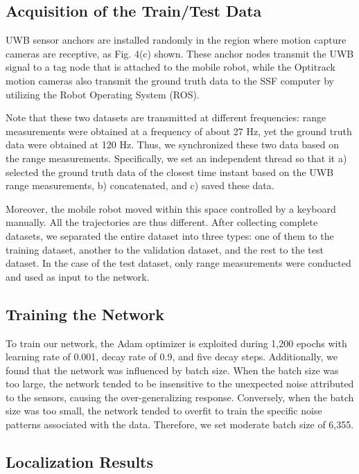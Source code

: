 \documentclass[letterpaper, 10 pt, conference]{ieeeconf}
\begin{document}
\subsection{Acquisition of the Train/Test Data}

UWB sensor anchors are installed randomly in the region where motion capture cameras are receptive, as Fig. 4(c)
 shown. These anchor nodes transmit the UWB signal to a tag node that is attached to the mobile robot, while the Optitrack motion cameras also transmit the ground truth data to the SSF computer by utilizing the Robot Operating System (ROS).

Note that these two datasets are transmitted at different frequencies: range measurements were obtained at a frequency of about 27 Hz, yet the ground truth data were obtained at 120 Hz. Thus, we synchronized these two data based on the range measurements. Specifically, we set an independent thread so that it a) selected the ground truth data of the closest time instant based on the UWB range measurements, b) concatenated, and c) saved these data.

Moreover, the mobile robot moved within this space controlled by a keyboard manually. All the trajectories are thus different. After collecting complete datasets, we separated the entire dataset into three types: one of them to the training dataset, another to the validation dataset, and the rest to the test dataset. In the case of the test dataset, only range measurements were conducted and used as input to the network.

\subsection{Training the Network}

To train our network, the Adam optimizer is exploited during 1,200 epochs with learning rate of 0.001, decay rate of 0.9, and five decay steps. Additionally, we found that the network was influenced by batch size. When the batch size was too large, the network tended to be insensitive to the unexpected noise attributed to the sensors, causing the over-generalizing response. Conversely, when the batch size was too small, the network tended to overfit to train the specific noise patterns associated with the data. Therefore, we set moderate batch size of 6,355.

\subsection{Localization Results}
\end{document}

